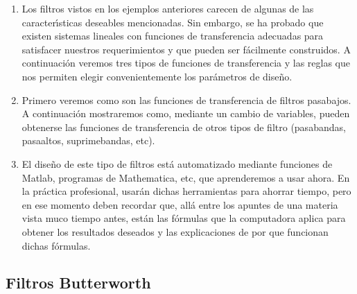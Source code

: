 \begin{enumerate}
\item Los filtros vistos en los ejemplos anteriores carecen de algunas de las caracter\'{\i}sticas 
deseables mencionadas. Sin embargo, se ha probado que existen sistemas lineales con funciones de 
transferencia adecuadas para satisfacer nuestros requerimientos y que pueden ser f\'{a}cilmente 
construidos. A continuaci\'{o}n veremos tres tipos de funciones de transferencia y las reglas que nos 
permiten elegir convenientemente los par\'{a}metros de dise\~{n}o.

\item Primero veremos como son las funciones de transferencia de filtros pasabajos. A continuaci\'{o}n
mostraremos como, mediante un cambio de variables, pueden obtenerse las funciones de transferencia de
otros tipos de filtro (pasabandas, pasaaltos, suprimebandas, etc). 

\item El dise\~{n}o de este tipo de filtros est\'{a} automatizado mediante funciones de Matlab, programas
de Mathematica, etc, que aprenderemos a usar ahora. En la pr\'{a}ctica profesional, usar\'{a}n dichas 
herramientas para ahorrar tiempo, pero en ese momento deben recordar que, all\'{a} entre los apuntes
de una materia vista muco tiempo antes, est\'{a}n las f\'{o}rmulas que la computadora aplica para
obtener los resultados deseados y las explicaciones de por que funcionan dichas f\'{o}rmulas.

\end{enumerate}

\subsection{Filtros Butterworth}

